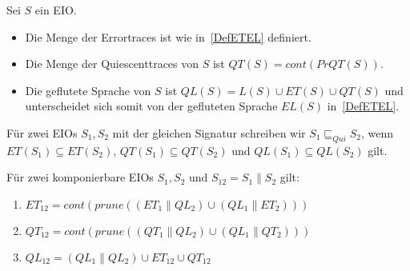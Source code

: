 \begin{Def}
  \label{DefQTQL}
  Sei $S$ ein EIO.
  \begin{itemize}
    \item Die Menge der Errortraces ist wie in~\ref{DefETEL} definiert.
    \item Die Menge der Quiescenttraces von $S$ ist $QT(S) = cont(PrQT(S))$.
    \item Die geflutete Sprache von $S$ ist $QL(S)=L(S)\cup ET(S)\cup QT(S)$
      und unterscheidet sich somit von der gefluteten Sprache $EL(S)$
      in~\ref{DefETEL}.
  \end{itemize}
  Für zwei EIOs $S_1, S_2$ mit der gleichen Signatur schreiben wir
  $S_1\sqsubseteq _{Qui} S_2$, wenn $ET(S_1)\subseteq ET(S_2)$,
  $QT(S_1)\subseteq QT(S_2)$ und $QL(S_1)\subseteq QL(S_2)$ gilt.
\end{Def}

\begin{satz}
  Für zwei komponierbare EIOs $S_1, S_2$ und $S_{12} = S_1\|S_2$ gilt:
  \begin{enumerate}
    \item $ET_{12} = cont(prune((ET_1\|QL_2)\cup (QL_1\|ET_2)))$
    \item $QT_{12} = cont(prune((QT_1\|QL_2)\cup (QL_1\|QT_2)))$%
    \item $QL_{12} = (QL_1\|QL_2)\cup ET_{12}\cup QT_{12}$%
  \end{enumerate}
\end{satz}

